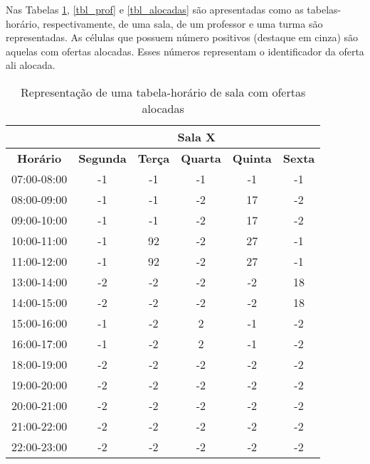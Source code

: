 Nas Tabelas \ref{tbl_ofertas}, \ref{tbl_prof} e \ref{tbl_alocadas} são apresentadas como as tabelas-horário, respectivamente, de uma sala, de um professor e uma turma são representadas. As células que possuem número positivos (destaque em cinza) são aquelas com ofertas alocadas. Esses números representam o identificador da oferta ali alocada.

\begin{table}
\centering
\begin{tabular}{|c|c|c|c|c|c|}
\hline
\textbf{} & \multicolumn{5}{c|}{\textbf{Sala X}} \\ \hline
\textbf{Horário} & \textbf{Segunda} & \textbf{Terça} & \textbf{Quarta} & \textbf{Quinta} & \textbf{Sexta} \\ \hline
07:00-08:00 & -1 & -1 & -1 & -1 & -1 \\ \hline
08:00-09:00 & -1 & -1 & -2 & \cellcolor[HTML]{C0C0C0}17 & -2 \\ \hline
09:00-10:00 & -1 & -1 & -2 & \cellcolor[HTML]{C0C0C0}17 & -2 \\ \hline
10:00-11:00 & -1 & \cellcolor[HTML]{C0C0C0}92 & -2 & \cellcolor[HTML]{C0C0C0}27 & -1 \\ \hline
11:00-12:00 & -1 & \cellcolor[HTML]{C0C0C0}92 & -2 & \cellcolor[HTML]{C0C0C0}27 & -1 \\ \hline
13:00-14:00 & -2 & -2 & -2 & -2 & \cellcolor[HTML]{C0C0C0}18 \\ \hline
14:00-15:00 & -2 & -2 & -2 & -2 & \cellcolor[HTML]{C0C0C0}18 \\ \hline
15:00-16:00 & -1 & -2 & \cellcolor[HTML]{C0C0C0}2 & -1 & -2 \\ \hline
16:00-17:00 & -1 & -2 & \cellcolor[HTML]{C0C0C0}2 & -1 & -2 \\ \hline
18:00-19:00 & -2 & -2 & -2 & -2 & -2 \\ \hline
19:00-20:00 & -2 & -2 & -2 & -2 & -2 \\ \hline
20:00-21:00 & -2 & -2 & -2 & -2 & -2 \\ \hline
21:00-22:00 & -2 & -2 & -2 & -2 & -2 \\ \hline
22:00-23:00 & -2 & -2 & -2 & -2 & -2 \\ \hline
\end{tabular}
\caption{Representação de uma tabela-horário de sala com ofertas alocadas}
\label{tbl_ofertas}
\end{table}

